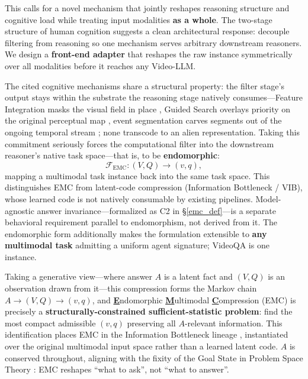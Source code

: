 This calls for a novel mechanism that jointly reshapes reasoning structure and cognitive load while treating input modalities \textbf{as a whole}. The two-stage structure of human cognition \citep{FITNO1, GS2.0NO2} suggests a clean architectural response: decouple filtering from reasoning so one mechanism serves arbitrary downstream reasoners. We design a \textbf{front-end adapter} that reshapes the raw instance symmetrically over all modalities before it reaches any Video-LLM.

The cited cognitive mechanisms share a structural property: the filter stage's output stays within the substrate the reasoning stage natively consumes---Feature Integration masks the visual field in place \citep{FITNO1}, Guided Search overlays priority on the original perceptual map \citep{GS2.0NO2}, event segmentation carves segments out of the ongoing temporal stream \citep{zacks2007event}; none transcode to an alien representation. Taking this commitment seriously forces the computational filter into the downstream reasoner's native task space---that is, to be \textbf{endomorphic}:
\[
\mathcal{F}_{\text{EMC}} : (V, Q) \rightarrow (v, q),
\]
mapping a multimodal task instance back into the same task space. This distinguishes EMC from latent-code compression (Information Bottleneck / VIB), whose learned code is not natively consumable by existing pipelines. Model-agnostic answer invariance---formalized as C2 in \S\ref{emc_def}---is a separate behavioral requirement parallel to endomorphism, not derived from it. The endomorphic form additionally makes the formulation extensible to \textbf{any multimodal task} admitting a uniform agent signature; VideoQA is one instance.

Taking a generative view---where answer $A$ is a latent fact and $(V, Q)$ is an observation drawn from it---this compression forms the Markov chain $A \to (V, Q) \to (v, q)$, and \underline{\textbf{E}}ndomorphic \underline{\textbf{M}}ultimodal \underline{\textbf{C}}ompression (EMC) is precisely a \textbf{structurally-constrained sufficient-statistic problem}: find the most compact admissible $(v, q)$ preserving all $A$-relevant information. This identification places EMC in the Information Bottleneck lineage \citep{tishby1999information, tishby2015deep}, instantiated over the original multimodal input space rather than a learned latent code. $A$ is conserved throughout, aligning with the fixity of the Goal State in Problem Space Theory \citep{HumanProblemSolvingNO12}: EMC reshapes ``what to ask'', not ``what to answer''.

